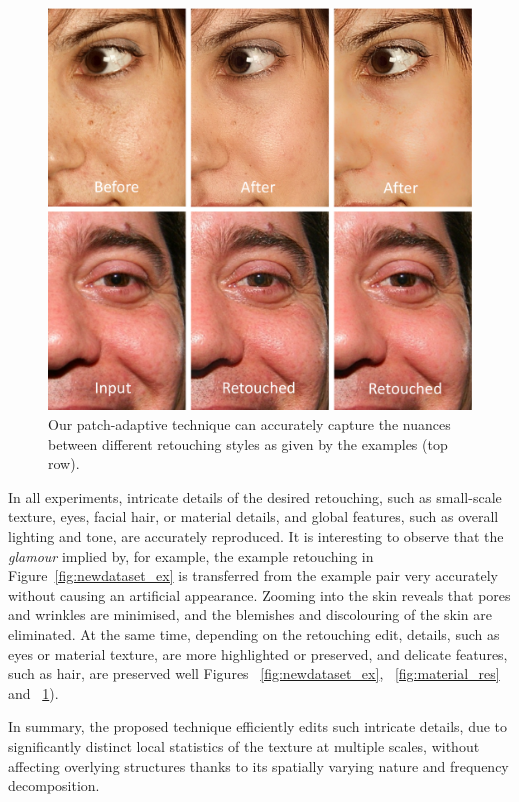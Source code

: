 \begin{figure}[th] %
    \centering
	\includegraphics[width=\columnwidth]{Chapters/detail-retouching-figs/Nuances.pdf}
    \caption{Our patch-adaptive technique can accurately capture the nuances between different
    retouching styles as given by the examples (top row).}
\label{fig:retouchingstyles}
\end{figure}


In all experiments, intricate details of the desired retouching, such as small-scale texture, eyes, facial hair, or material details, and global features, such as overall lighting and tone, are accurately reproduced. It is interesting to observe that the \emph{glamour} implied by, for example, the example retouching in Figure~\ref{fig:newdataset_ex} is transferred from the example pair very accurately without causing an artificial appearance. Zooming into the skin reveals that pores and wrinkles are minimised, and the blemishes and discolouring of the skin are eliminated. At the same time, depending on the retouching edit, details, such as eyes or material texture, are more highlighted or preserved, and delicate features, such as hair, are preserved well Figures ~\ref{fig:newdataset_ex}, ~\ref{fig:material_res} and ~\ref{fig:retouchingstyles}).

In summary, the proposed technique efficiently edits such intricate details, due to significantly distinct local statistics of the texture at multiple scales, without affecting overlying structures thanks to its spatially varying nature and frequency decomposition.

